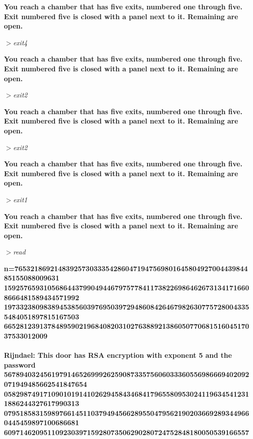 \documentclass[11pt]{article}
\begin{document}
\begin{justify}
	\textbf{You reach a chamber that has five exits, numbered one through five. Exit numbered five is closed with a panel next to it. Remaining are open.
	}
\end{justify}
$>$\textit{exit4}


\begin{justify}
	\textbf{You reach a chamber that has five exits, numbered one through five. Exit numbered five is closed with a panel next to it. Remaining are open.
	}
\end{justify}
$>$\textit{exit2}


\begin{justify}
	\textbf{You reach a chamber that has five exits, numbered one through five. Exit numbered five is closed with a panel next to it. Remaining are open.
	}
\end{justify}
$>$\textit{exit2}


\begin{justify}
	\textbf{You reach a chamber that has five exits, numbered one through five. Exit numbered five is closed with a panel next to it. Remaining are open.
	}
\end{justify}
$>$\textit{exit1}


\begin{justify}
	\textbf{You reach a chamber that has five exits, numbered one through five. Exit numbered five is closed with a panel next to it. Remaining are open.
	}
\end{justify}
$>$\textit{read}


\begin{justify}
\textbf{n=7653218692148392573033354286047194756980164580492700443984485155088009631\\159257659310568644379904944679757784117382269864626731341716608666481589434571992\\197332380983894538560397695039729486084264679826307757280043355484051897815167503\\6652812391378489590219684082031027638892138605077068151604517037533012009\\
\\Rijndael: This door has RSA encryption with exponent 5 and the password\\ 56789403245619791465269992625908733575606033360556986669402092071949485662541847654\\058298749171090101914102629458434684179655809530241196345412311886244327617990313\\079518583159897661451103794945662895504795621902036692893449660445459897100686681\\60971462095110923039715928073506290280724752848180050539166557}
\end{justify}
\end{document}
